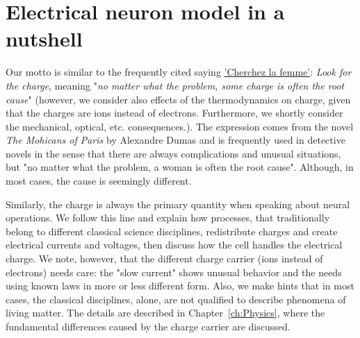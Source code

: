 
\section[Electrical model
]{Electrical neuron model in a nutshell\label{sec:Single-ElectricalNutshell}}


Our motto is similar to the frequently cited saying \href{https://en.wikipedia.org/wiki/Cherchez_la_femme"}{'Cherchez la femme'}:
\textit{Look for the charge},
meaning "\textit{no matter what the problem, some charge is often the root cause}" (however, we consider also effects of the thermodynamics 
on charge, given that the charges are ions instead of electrons. Furthermore, we shortly consider the mechanical, optical, etc. consequences.).
The expression comes from the novel \textit{The Mohicans of Paris} by Alexandre Dumas and is frequently used
in detective novels in the sense that there are always complications and unusual
situations, but "no matter what the problem, a woman is often the root cause". 
Although, in most cases, the cause is seemingly different.

Similarly, the charge is always the primary quantity when speaking about neural operations. 
We follow this line and explain how processes, that traditionally
belong to different classical science disciplines, redistribute charges and create
electrical currents and voltages, then discuss how the cell handles the electrical charge. We note, however, that the different charge carrier (ions instead of electrons) needs care: the "slow current"
shows unusual behavior and the needs using known laws in 
more or less different form.
Also, we make hints that in most cases, the classical disciplines, alone, are not qualified to describe phenomena of living matter.
The details are described in Chapter~\ref{ch:Physics}, where
the fundamental differences caused by the charge carrier are discussed. 

